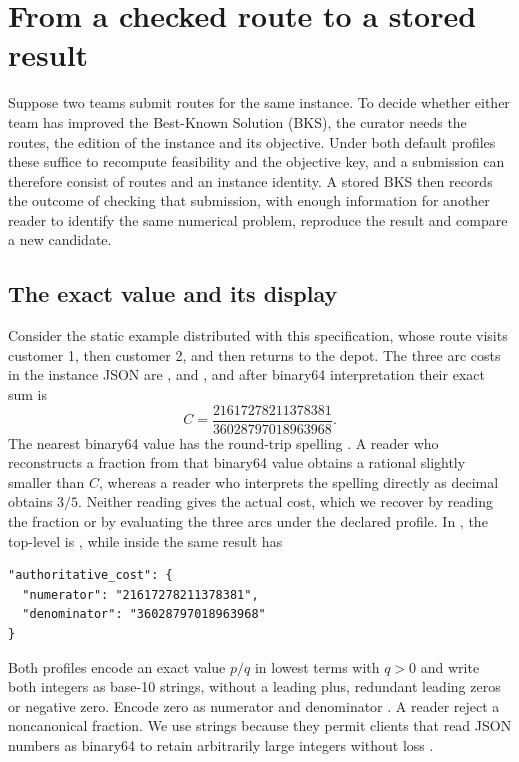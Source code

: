 \section{From a checked route to a stored result}\label{sec:results}

Suppose two teams submit routes for the same instance. To decide whether either team has improved the Best-Known Solution (BKS), the curator needs the routes, the edition of the instance and its objective. Under both default profiles these suffice to recompute feasibility and the objective key, and a submission can therefore consist of routes and an instance identity. A stored BKS then records the outcome of checking that submission, with enough information for another reader to identify the same numerical problem, reproduce the result and compare a new candidate.

\subsection{The exact value and its display}

Consider the static example distributed with this specification, whose route visits customer 1, then customer 2, and then returns to the depot. The three arc costs in the instance JSON are ,  and , and after binary64 interpretation their exact sum is
\[
 C=\frac{21617278211378381}{36028797018963968}.
\]
The nearest binary64 value has the round-trip spelling . A reader who reconstructs a fraction from that binary64 value obtains a rational slightly smaller than $C$, whereas a reader who interprets the spelling directly as decimal obtains $3/5$. Neither reading gives the actual cost, which we recover by reading the fraction or by evaluating the three arcs under the declared profile. In , the top-level  is , while inside  the same result has
\begin{verbatim}
"authoritative_cost": {
  "numerator": "21617278211378381",
  "denominator": "36028797018963968"
}
\end{verbatim}

Both profiles encode an exact value $p/q$ in lowest terms with $q>0$ and write both integers as base-10 strings, without a leading plus, redundant leading zeros or negative zero. Encode zero as numerator  and denominator . A reader \must{} reject a noncanonical fraction. We use strings because they permit clients that read JSON numbers as binary64 to retain arbitrarily large integers without loss \autocite{brayJSON2017}.

